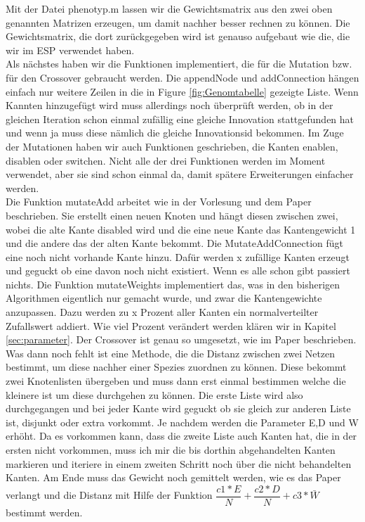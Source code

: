 \documentclass{hbrs-ecta-report}
\begin{document}
Mit der Datei phenotyp.m lassen wir die Gewichtsmatrix aus den zwei oben genannten Matrizen erzeugen, um damit nachher besser rechnen zu können. Die Gewichtsmatrix, die dort zurückgegeben wird ist genauso aufgebaut wie die, die wir im ESP verwendet haben.\\

Als nächstes haben wir die Funktionen implementiert, die für die Mutation bzw. für den Crossover gebraucht werden. Die appendNode und addConnection hängen einfach nur weitere Zeilen in die in Figure \ref{fig:Genomtabelle} gezeigte Liste. Wenn Kannten hinzugefügt wird muss allerdings noch überprüft werden, ob in der gleichen Iteration schon einmal zufällig eine gleiche Innovation stattgefunden hat und wenn ja muss diese nämlich die gleiche Innovationsid bekommen. Im Zuge der Mutationen haben wir auch Funktionen geschrieben, die Kanten enablen, disablen oder switchen. Nicht alle der drei Funktionen werden im Moment verwendet, aber sie sind schon einmal da, damit spätere Erweiterungen einfacher werden.\\ 
Die Funktion mutateAdd arbeitet wie in der Vorlesung und dem Paper beschrieben. Sie erstellt einen neuen Knoten und hängt diesen zwischen zwei, wobei die alte Kante disabled wird und die eine neue Kante das Kantengewicht 1 und die andere das der alten Kante bekommt.
Die MutateAddConnection fügt eine noch nicht vorhande Kante hinzu. Dafür werden x zufällige Kanten erzeugt und geguckt ob eine davon noch nicht existiert. Wenn es alle schon gibt passiert nichts.
Die Funktion mutateWeights implementiert das, was in den bisherigen Algorithmen eigentlich nur gemacht wurde, und zwar die Kantengewichte anzupassen. Dazu werden zu x Prozent aller Kanten ein normalverteilter Zufallswert addiert. Wie viel Prozent verändert werden klären wir in Kapitel \ref{sec:parameter}. Der Crossover ist genau so umgesetzt, wie im Paper beschrieben.\\

Was dann noch fehlt ist eine Methode, die die Distanz zwischen zwei Netzen bestimmt, um diese nachher einer Spezies zuordnen zu können. Diese bekommt zwei Knotenlisten übergeben und muss dann erst einmal bestimmen welche die kleinere ist um diese durchgehen zu können. Die erste Liste wird also durchgegangen und bei jeder Kante wird geguckt ob sie gleich zur anderen Liste ist, disjunkt oder extra vorkommt. Je nachdem werden die Parameter E,D und W erhöht. Da es vorkommen kann, dass die zweite Liste auch Kanten hat, die in der ersten nicht vorkommen, muss ich mir die bis dorthin abgehandelten Kanten markieren und iteriere in einem zweiten Schritt noch über die nicht behandelten Kanten. Am Ende muss das Gewicht noch gemittelt werden, wie es das Paper verlangt und die Distanz mit Hilfe der Funktion $ \dfrac{c1*E}{N}+\dfrac{c2*D}{N}+c3*\bar{W}$ bestimmt werden.\\
\end{document}
